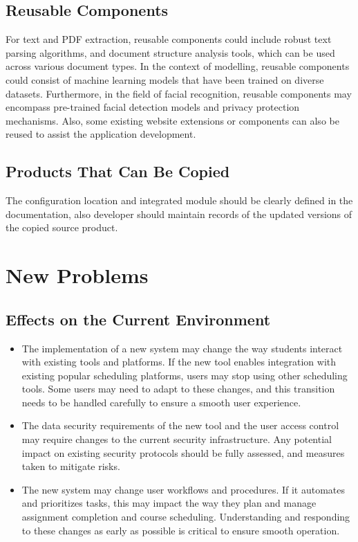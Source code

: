 \documentclass[12pt]{article}
\begin{document}
\subsection{Reusable Components}
For text and PDF extraction, reusable components could include robust text parsing algorithms, and document structure analysis tools, which can be used across various document types. In the context of modelling, reusable components could consist of machine learning models that have been trained on diverse datasets. Furthermore, in the field of facial recognition, reusable components may encompass pre-trained facial detection models and privacy protection mechanisms. Also, some existing website extensions or components can also be reused to assist the application development. \\
\subsection{Products That Can Be Copied}
The configuration location and integrated module should be clearly defined in the documentation, also developer should maintain records of the updated versions of the copied source product.\\


\section{New Problems}
\subsection{Effects on the Current Environment}

\begin{itemize}
    \item The implementation of a new system may change the way students interact with existing tools and platforms. If the new tool enables integration with existing popular scheduling platforms, users may stop using other scheduling tools. Some users may need to adapt to these changes, and this transition needs to be handled carefully to ensure a smooth user experience.

    \item The data security requirements of the new tool and the user access control may require changes to the current security infrastructure. Any potential impact on existing security protocols should be fully assessed, and measures taken to mitigate risks.

    \item The new system may change user workflows and procedures. If it automates and prioritizes tasks, this may impact the way they plan and manage assignment completion and course scheduling. Understanding and responding to these changes as early as possible is critical to ensure smooth operation.
\end{itemize}
\end{document}
